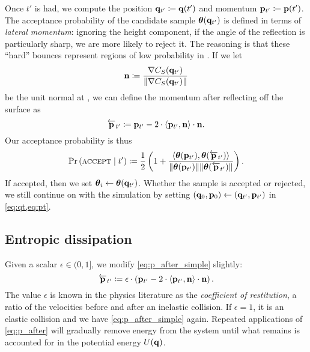 Once $t'$ is had, we compute the position $\mathbf{q}_{t'} \coloneqq \mathbf{q}(t')$ and
momentum $\mathbf{p}_{t'} \coloneqq \mathbf{p}(t')$. The acceptance probability of the
candidate sample $\boldsymbol{\theta}(\mathbf{q}_{t'})$ is defined in terms of \emph{lateral
momentum}: ignoring the height component, if the angle of the reflection is
particularly sharp, we are more likely to reject it. The reasoning is that these
``hard'' bounces represent regions of low probability in \target{}. If we let
\begin{equation*}
    \mathbf{n} \coloneqq \frac{\nabla C_{S}({\mathbf{q}_{t'}})}{\lVert \nabla C_{S}({\mathbf{q}_{t'}}) \rVert}
\end{equation*}
be the unit normal at , we can define the momentum after reflecting off
the surface as
\begin{equation}
    \label{eq:p_after_simple}
    \overleftarrow{\mathbf{p}}_{t'} \coloneqq \mathbf{p}_{t'} - 2 \cdot \left<\mathbf{p}_{t'}, \mathbf{n}\right> \cdot \mathbf{n}.
\end{equation}
Our acceptance probability is thus
\begin{equation}
    \label{eq:accept}
    \Pr\left(\textsc{accept} \mid t'\right)
    \coloneqq \frac{1}{2}
    \left(1 + \frac{
        \left<\boldsymbol{\theta}(\mathbf{p}_{t'}),\boldsymbol{\theta}(\overleftarrow{\mathbf{p}}_{t'})\right>
    }{
        \lVert \boldsymbol{\theta}(\mathbf{p}_{t'}) \rVert \lVert \boldsymbol{\theta}(\overleftarrow{\mathbf{p}}_{t'}) \rVert
    }\right).
\end{equation}
If accepted, then we set $\boldsymbol{\theta}_i \gets \boldsymbol{\theta}(\mathbf{q}_{t'})$. Whether the
sample is accepted or rejected, we still continue on with the simulation
by setting $(\mathbf{q}_{0}{}, \mathbf{p}_{0}{}) \gets (\mathbf{q}_{t'}, \mathbf{p}_{t'})$ in \cref{eq:qt,eq:pt}.

\subsection{Entropic dissipation} \label{ss:entropy}

Given a scalar $\epsilon \in (0,1]$, we modify \cref{eq:p_after_simple} slightly:
\begin{equation}
    \label{eq:p_after}
    \overleftarrow{\mathbf{p}}_{t'} \coloneqq \epsilon \cdot \left(\mathbf{p}_{t'} - 2 \cdot \left<\mathbf{p}_{t'}, \mathbf{n}\right> \cdot \mathbf{n}\right).
\end{equation}
The value $\epsilon$ is known in the physics literature as the \emph{coefficient
of restitution}, a ratio of the velocities before and after an inelastic
collision. If $\epsilon = 1$, it is an elastic collision and we have
\cref{eq:p_after_simple} again. Repeated applications of \cref{eq:p_after} will
gradually remove energy from the system until what remains is accounted for in
the potential energy $U(\mathbf{q}{})$.

